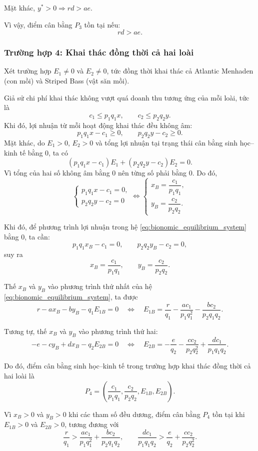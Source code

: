 Mặt khác,
$y^*>0 \Longrightarrow rd>ae$.

Vì vậy, điểm cân bằng $P_3$ tồn tại nếu:
\[
rd>ae.
\]

\subsubsection{Trường hợp 4: Khai thác đồng thời cả hai loài}

Xét trường hợp $E_1\neq 0$ và $E_2\neq 0$, tức đồng thời khai thác cả Atlantic Menhaden (con mồi) và Striped Bass (vật săn mồi).

Giả sử chi phí khai thác không vượt quá doanh thu tương ứng
của mỗi loài, tức là
\[
    c_1 \leq p_1q_1x,\qquad c_2 \leq p_2q_2y.
\]
Khi đó, lợi nhuận từ mỗi hoạt động khai thác đều không âm:
\[
    p_1q_1x-c_1 \geq 0,\qquad p_2q_2y-c_2 \geq 0.
\]
Mặt khác, do $E_1>0$, $E_2>0$ và tổng lợi nhuận
tại trạng thái cân bằng sinh học--kinh tế bằng $0$, ta có
\[
    (p_1q_1x-c_1)E_1+(p_2q_2y-c_2)E_2=0.
\]
Vì tổng của hai số không âm bằng $0$ nên từng số
phải bằng $0$. Do đó,
\[
    \begin{cases}
        p_1q_1x-c_1=0,\\
        p_2q_2y-c_2=0
    \end{cases}
    \Longleftrightarrow
    \begin{cases}
        x_B=\dfrac{c_1}{p_1q_1},\\[6pt]
        y_B=\dfrac{c_2}{p_2q_2}.
    \end{cases}
\]

Khi đó, để phương trình lợi nhuận trong hệ
\eqref{eq:bionomic_equilibrium_system} bằng $0$, ta cần:
\[
p_1q_1x_B-c_1=0,
\qquad
p_2q_2y_B-c_2=0,
\]
suy ra
\[
x_B=\frac{c_1}{p_1q_1},
\qquad
y_B=\frac{c_2}{p_2q_2}.
\]

Thế $x_B$ và $y_B$ vào phương trình thứ nhất của hệ
\eqref{eq:bionomic_equilibrium_system}, ta được
\[
r-ax_B-by_B-q_1E_{1B}=0
\quad\Longleftrightarrow\quad
E_{1B}
=
\frac{r}{q_1}
-
\frac{ac_1}{p_1q_1^2}
-
\frac{bc_2}{p_2q_1q_2}.
\]

Tương tự, thế $x_B$ và $y_B$ vào phương trình thứ hai:
\[
-e-cy_B+dx_B-q_2E_{2B}=0
\quad\Longleftrightarrow\quad
E_{2B}
=
-\frac{e}{q_2}
-
\frac{cc_2}{p_2q_2^2}
+
\frac{dc_1}{p_1q_1q_2}.
\]

Do đó, điểm cân bằng sinh học--kinh tế trong trường hợp khai thác đồng thời cả hai loài là
\[
P_4
=
\left(
\frac{c_1}{p_1q_1},
\frac{c_2}{p_2q_2},
E_{1B},
E_{2B}
\right).
\]

Vì $x_B>0$ và $y_B>0$ khi các tham số đều dương, điểm cân bằng $P_4$ tồn tại khi
$E_{1B}>0$ và $E_{2B}>0$, tương đương với
\[
\frac{r}{q_1}
>
\frac{ac_1}{p_1q_1^2}
+
\frac{bc_2}{p_2q_1q_2},
\qquad
\frac{dc_1}{p_1q_1q_2}
>
\frac{e}{q_2}
+
\frac{cc_2}{p_2q_2^2}.
\]


